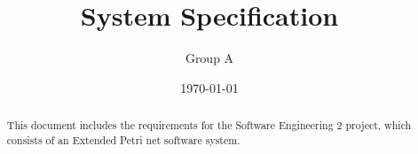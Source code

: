 \documentclass[11pt]{article}   %
\title{System Specification\\ \epns}
\author{Group A}
\date{\today}
\begin{document}
\maketitle

\begin{abstract}
This document includes the requirements for the Software Engineering 2 project, which consists of an Extended Petri net software system.
\end{abstract}

\tableofcontents \newpage


\newpage






\printindex
\end{document}
